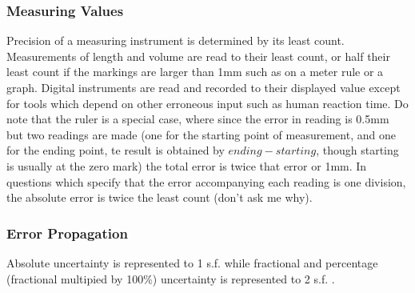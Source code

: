 \documentclass[../main]{subfiles}
\begin{document}



	\subsubsection{Measuring Values}

	Precision of a measuring instrument is determined by its least count. Measurements of length and volume are read to their least count, or half their least count if the markings are larger than 1mm such as on a meter rule or a graph. Digital instruments are read and recorded to their displayed value except for tools which depend on other erroneous input such as human reaction time. Do note that the ruler is a special case, where since the error in reading is 0.5mm but two readings are made (one for the starting point of measurement, and one for the ending point, te result is obtained by \(ending-starting\), though starting is usually at the zero mark) the total error is twice that error or 1mm. In questions which specify that the error accompanying each reading is one division, the absolute error is twice the least count (don't ask me why).

	\subsubsection{Error Propagation}


	Absolute uncertainty is represented to 1 s.f. while fractional and percentage (fractional multipied by 100\%) uncertainty is represented to 2 s.f. . \\
\end{document}
